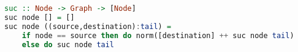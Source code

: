 \begin{lstlisting}[language=haskell]
suc :: Node -> Graph -> [Node]
suc node [] = []
suc node ((source,destination):tail) =
    if node == source then do norm([destination] ++ suc node tail)
    else do suc node tail
\end{lstlisting}